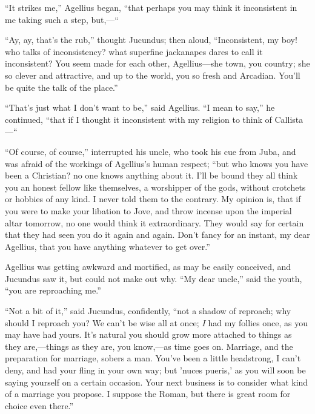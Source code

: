 ``It strikes me,'' Agellius began, ``that perhaps you
may think it inconsistent in me taking such a step, but,—``

``Ay, ay, that's the rub,'' thought Jucundus; then aloud,
``Inconsistent, my boy! who talks of inconsistency? what superfine
jackanapes dares to call it inconsistent? You seem made for each
other, Agellius—she town, you country; she so clever and attractive,
and up to the world, you so fresh and Arcadian. You'll be quite the
talk of the place.''

``That's just what I don't want to be,'' said Agellius.
``I mean to say,'' he continued, ``that if I thought it
inconsistent with my religion to think of Callista—``

``Of course, of course,'' interrupted his uncle, who took
his cue from Juba, and was afraid of the workings of Agellius's human
respect; ``but who knows you have been a Christian? no one knows
anything about it. I'll be bound they all think you an honest fellow
like themselves, a worshipper of the gods, without crotchets or
hobbies of any kind. I never told them to the contrary. My opinion is,
that if you were to make your libation to Jove, and throw incense upon
the imperial altar tomorrow, no one would think it extraordinary. They
would say for certain that they had seen you do it again and
again. Don't fancy for an instant, my dear Agellius, that you have
anything whatever to get over.''

Agellius was getting awkward and mortified, as may be easily
conceived, and Jucundus saw it, but could not make out why. ``My
dear uncle,'' said the youth, ``you are reproaching me.''

``Not a bit of it,'' said Jucundus, confidently,
``not a shadow of reproach; why should I reproach you? We can't be
wise all at once; \emph{I} had my follies once, as you may have had
yours. It's natural you should grow more attached to things as they
are,—things as they are, you know,—as time goes on. Marriage, and
the preparation for marriage, sobers a man. You've been a little
headstrong, I can't deny, and had your fling in your own way; but 'nuces
pueris,' as you will soon be saying yourself on a certain occasion.
Your next business is to consider what kind of a marriage you propose.
I suppose the Roman, but there is great room for choice even
there.''

